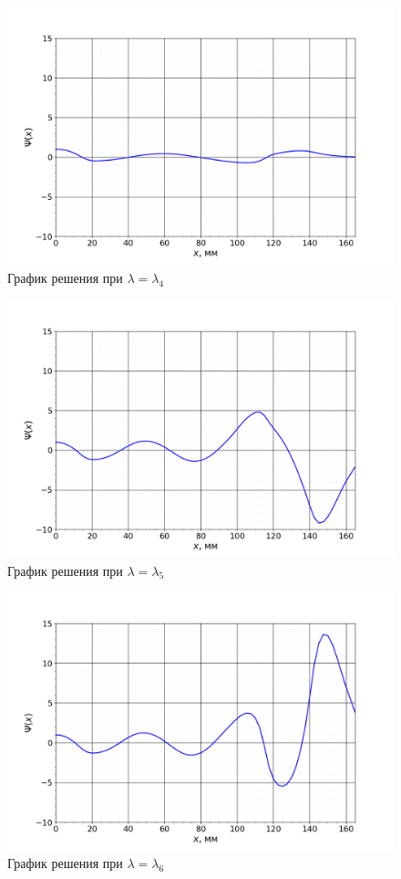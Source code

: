 		
		\begin{figure}[h!]
			\centering
			\includegraphics[width=0.92\linewidth]{Pictures/Scaled/4_Scaled.png}
			\caption{График решения при $\lambda = \lambda_4$}
		\end{figure}
		

		\newpage
		\begin{figure}[h!]
			\centering
			\includegraphics[width=0.92\linewidth]{Pictures/Scaled/5_Scaled.png}
			\caption{График решения при $\lambda = \lambda_5$}
		\end{figure}
		
		
		\begin{figure}[h!]
			\centering
			\includegraphics[width=0.92\linewidth]{Pictures/Scaled/6_Scaled.png}
			\caption{График решения при $\lambda = \lambda_6$}
		\end{figure}
		
